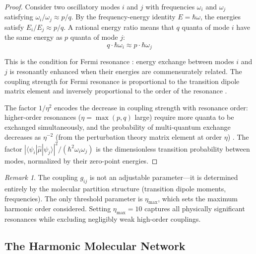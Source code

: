 \documentclass[11pt,twocolumn,a4paper]{article}
\theoremstyle{definition}
\theoremstyle{remark}
\newtheorem{remark}[theorem]{Remark}
\newcommand{\etamax}{\eta_{\mathrm{max}}}
\begin{document}
\begin{proof}
Consider two oscillatory modes $i$ and $j$ with frequencies $\omega_i$ and $\omega_j$ satisfying $\omega_i/\omega_j \approx p/q$. By the frequency-energy identity $E = \hbar\omega$, the energies satisfy $E_i/E_j \approx p/q$. A rational energy ratio means that $q$ quanta of mode $i$ have the same energy as $p$ quanta of mode $j$:
\begin{equation}
q \cdot \hbar\omega_i \approx p \cdot \hbar\omega_j
\label{eq:resonance_condition}
\end{equation}

This is the condition for Fermi resonance \citep{fermi1931}: energy exchange between modes $i$ and $j$ is resonantly enhanced when their energies are commensurately related. The coupling strength for Fermi resonance is proportional to the transition dipole matrix element and inversely proportional to the order of the resonance \citep{herzberg1945, wilson1955}.

The factor $1/\eta^2$ encodes the decrease in coupling strength with resonance order: higher-order resonances ($\eta = \max(p,q)$ large) require more quanta to be exchanged simultaneously, and the probability of multi-quantum exchange decreases as $\eta^{-2}$ (from the perturbation theory matrix element at order $\eta$) \citep{landau1977}. The factor $|\langle \psi_i|\hat{\mu}|\psi_j\rangle|^2/(\hbar^2\omega_i\omega_j)$ is the dimensionless transition probability between modes, normalized by their zero-point energies.
\end{proof}

\begin{remark}
The coupling $g_{ij}$ is not an adjustable parameter---it is determined entirely by the molecular partition structure (transition dipole moments, frequencies). The only threshold parameter is $\etamax$, which sets the maximum harmonic order considered. Setting $\etamax = 10$ captures all physically significant resonances while excluding negligibly weak high-order couplings.
\end{remark}

\subsection{The Harmonic Molecular Network}
\end{document}
